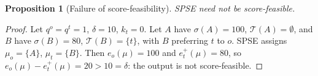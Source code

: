 \documentclass[10pt]{article}
\newtheorem{definition}{Definition}
\newtheorem{proposition}{Proposition}
\newcommand{\T}{\mathcal{T}}
\newcommand{\1}{\mathbf{1}}
\newcommand{\yao}[1]{{\color{blue}#1}}
\newcommand{\shimamura}[1]{{\color{red}#1}}
\begin{document}




\begin{proposition}[Failure of score-feasibility]\label{prop:score-feasibility-not-guaranteed}
SPSE need not be score-feasible.
\end{proposition}
\begin{proof}
Let $q^o=q^t=1$, $\delta=10$, $k_t=0$. Let $A$ have $\sigma(A)=100$, $\T(A)=\emptyset$, and $B$ have $\sigma(B)=80$, $\T(B)=\{t\}$, with $B$ preferring $t$ to $o$. SPSE assigns $\mu_o=\{A\}$, $\mu_t=\{B\}$. Then $e_o(\mu)=100$ and $e_t^+(\mu)=80$, so $e_o(\mu)-e_t^+(\mu)=20>10=\delta$: the output is not score-feasible.
\end{proof}
\end{document}
